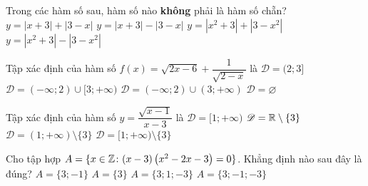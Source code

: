 \begin{ex}%
Trong các hàm số sau, hàm số nào {\bf không} phải là hàm số chẵn?
	\choice
	{$y=|x+3|+|3-x|$}
	{\True $y=|x+3|-|3-x|$}
	{$y=\left|x^2+3\right|+\left|3-x^2\right|$}
	{$y=\left|x^2+3\right|-\left|3-x^2\right|$}
\end{ex}

\begin{ex}%
Tập xác định của hàm số $f(x)=\sqrt{2x-6}+\dfrac{1}{\sqrt{2-x}}$ là
	\choice
	{$\mathscr{D}=(2;3]$}
	{$\mathscr{D}=(-\infty;2)\cup [3;+\infty)$}
	{$\mathscr{D}=(-\infty;2)\cup (3;+\infty)$}
	{\True $\mathscr{D}=\varnothing$}
\end{ex}

\begin{ex}%
Tập xác định của hàm số $y=\dfrac{\sqrt{x-1}}{x-3}$ là
	\choice
	{$\mathscr{D}=[1;+\infty)$}
	{$\mathscr{D}=\Bbb{R}\setminus \{3\}$}
	{$\mathscr{D}=(1;+\infty)\setminus\{3\}$}
	{\True $\mathscr{D}=[1;+\infty)\setminus\{3\}$}
	\loigiai{
	Điều kiện $\heva{& x-1\ge 0 \\ & x\neq 3}\Leftrightarrow \heva{& x\ge 1 \\ & x\neq 3.}$\\
	Tập xác định là $\mathscr{D}=[1;+\infty)\setminus\{3\}$.
	}
\end{ex}

\begin{ex}%
Cho tập hợp $A=\{x\in \Bbb{Z}\colon (x-3)\left(x^2-2x-3\right)=0\}$. Khẳng định nào sau đây là đúng?
	\choice
	{\True $A=\{3;-1\}$}
	{$A=\{3\}$}
	{$A=\{3;1;-3\}$}
	{$A=\{3;-1;-3\}$}
\end{ex}

